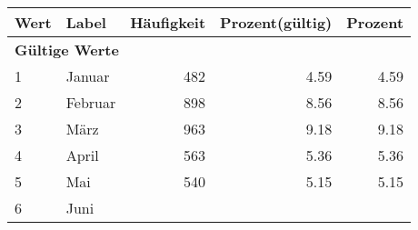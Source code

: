      \begin{longtable}{lXrrr}
     \toprule
     \textbf{Wert} & \textbf{Label} & \textbf{Häufigkeit} & \textbf{Prozent(gültig)} & \textbf{Prozent} \\
     \endhead
     \midrule
     \multicolumn{5}{l}{\textbf{Gültige Werte}}\\

     1 &
     \multicolumn{1}{X}{ Januar   } &


       \num{482} &
       \num[round-mode=places,round-precision=2]{4,59} &
         \num[round-mode=places,round-precision=2]{4,59} \\

     2 &
     \multicolumn{1}{X}{ Februar   } &


       \num{898} &
       \num[round-mode=places,round-precision=2]{8,56} &
         \num[round-mode=places,round-precision=2]{8,56} \\

     3 &
     \multicolumn{1}{X}{ März   } &


       \num{963} &
       \num[round-mode=places,round-precision=2]{9,18} &
         \num[round-mode=places,round-precision=2]{9,18} \\

     4 &
     \multicolumn{1}{X}{ April   } &


       \num{563} &
       \num[round-mode=places,round-precision=2]{5,36} &
         \num[round-mode=places,round-precision=2]{5,36} \\

     5 &
     \multicolumn{1}{X}{ Mai   } &


       \num{540} &
       \num[round-mode=places,round-precision=2]{5,15} &
         \num[round-mode=places,round-precision=2]{5,15} \\

     6 &
     \multicolumn{1}{X}{ Juni   } &



\end{longtable}
